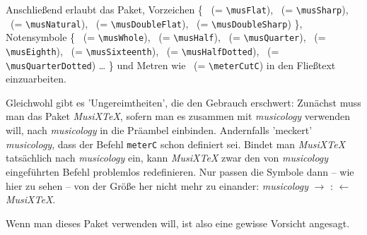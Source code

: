 Anschließend erlaubt das Paket, Vorzeichen \{
\musFlat \ (= \texttt{\small \textbackslash{musFlat}}),
\musSharp \ (= \texttt{\small \textbackslash{musSharp}}),
\musNatural \ (= \texttt{\small \textbackslash{musNatural}}),
\musDoubleFlat \ (= \texttt{\small \textbackslash{musDoubleFlat}}),
\musDoubleSharp \ (= \texttt{\small \textbackslash{musDoubleSharp}})
\}, Notensymbole \{
\musWhole \ (= \texttt{\small \textbackslash{musWhole}}),
\musHalf \ (= \texttt{\small \textbackslash{musHalf}}),
\musQuarter \ (= \texttt{\small \textbackslash{musQuarter}}),
\musEighth \ (= \texttt{\small \textbackslash{musEighth}}),
\musSixteenth \ (= \texttt{\small \textbackslash{musSixteenth}}),
\musHalfDotted \ (= \texttt{\small \textbackslash{musHalfDotted}}),
\musQuarterDotted \ (= \texttt{\small \textbackslash{musQuarterDotted}})
\ldots
\}
und Metren wie \meterCutC \ (= \texttt{\small \textbackslash{meterCutC}})
in den Fließtext einzuarbeiten.

Gleichwohl gibt es 'Ungereimtheiten', die den Gebrauch erschwert: Zunächst muss man das Paket \textit{MusiX\TeX}, sofern man es zusammen mit \textit{musicology} verwenden will, nach \textit{musicology} in die Präambel einbinden. Andernfalls 'meckert' \textit{musicology}, dass der Befehl \texttt{meterC} schon definiert sei. Bindet man \textit{MusiX\TeX} tatsächlich nach \textit{musicology} ein, kann \textit{MusiX\TeX} zwar den von \textit{musicology} eingeführten Befehl problemlos redefinieren. Nur passen die Symbole dann -- wie hier zu sehen -- von der Größe her nicht mehr zu einander: \textit{musicology} $\rightarrow$ \meterCutC : \meterC $\leftarrow$ \textit{MusiX\TeX}.

Wenn man dieses Paket verwenden will, ist also eine gewisse Vorsicht angesagt.


%
